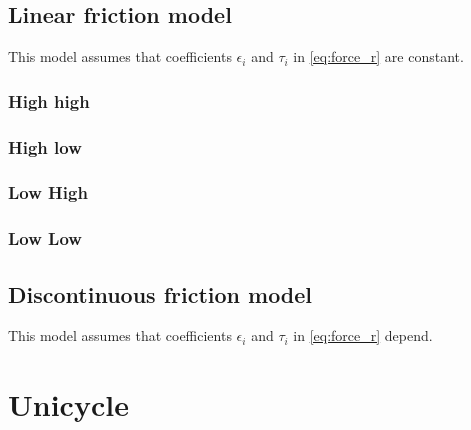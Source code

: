 \subsection{Linear friction model}
This model assumes that coefficients $\epsilon_i$ and $\tau_i$ in \eqref{eq:force_r} are constant.
\subsubsection{High high}

\subsubsection{High low}

\subsubsection{Low High}

\subsubsection{Low Low}

\subsection{Discontinuous friction model}
This model assumes that coefficients $\epsilon_i$ and $\tau_i$ in \eqref{eq:force_r} depend.
\section{Unicycle}